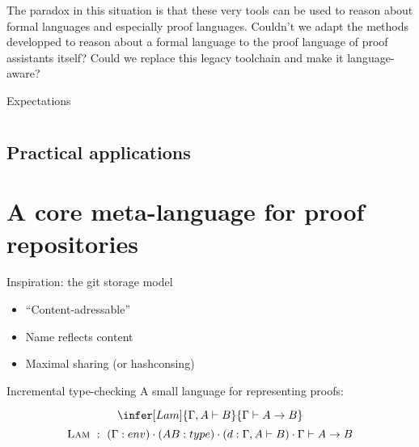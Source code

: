 \documentclass[ignorenonframetext,red]{beamer}
\begin{document}
The paradox in this situation is that these very tools can be used to
reason about formal languages and especially proof languages. Couldn't
we adapt the methods developped to reason about a formal language to
the proof language of proof assistants itself? Could we replace this
legacy toolchain and make it language-aware?

\begin{frame}{Expectations}
  
\end{frame}

\begin{frame}{}
  \tableofcontents
\end{frame}

\section{}

\subsection{Practical applications}

\section{A core meta-language for proof repositories}

\begin{frame}{Inspiration: the \textsf{git} storage model}
  \begin{itemize}
  \item ``Content-adressable''
  \item Name reflects content
  \item Maximal sharing (or hashconsing)
  \end{itemize}
\end{frame}

\begin{frame}{Incremental type-checking}
  A small language for representing proofs:
  \begin{example}
    \[ \infer[Lam]{\Gamma,A\vdash B}{\Gamma\vdash A\to B} \]
    \[ \textsc{Lam}\ :\ (\Gamma : env)\cdot(A B : type)\cdot
    (d : \Gamma,A\vdash B)\cdot \Gamma\vdash A\to B \]
  \end{example}
\end{frame}
\end{document}

